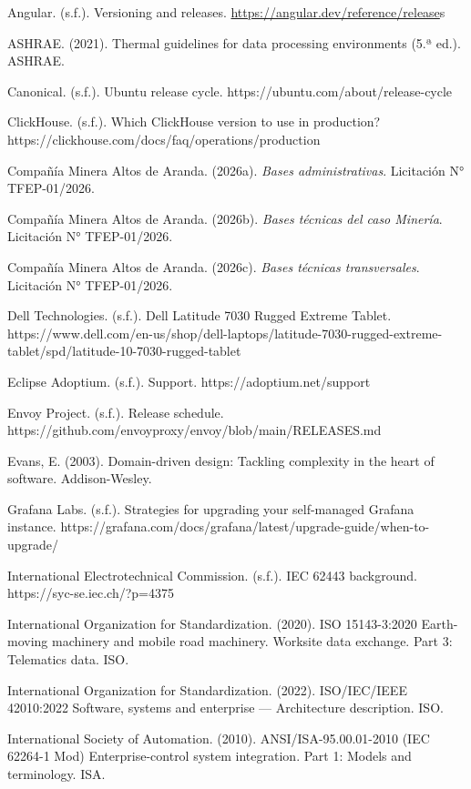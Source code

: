 \documentclass[subdoc]{../../comun/overfore}
\begin{document}
\begin{referencias}
\item Angular. (s.f.). Versioning and releases. \href{https://angular.dev/reference/releases}{https://angular.dev/reference/release}s
\item ASHRAE. (2021). Thermal guidelines for data processing environments (5.ª ed.). ASHRAE.
\item Canonical. (s.f.). Ubuntu release cycle. https://ubuntu.com/about/release-cycle
\item ClickHouse. (s.f.). Which ClickHouse version to use in production? https://clickhouse.com/docs/faq/operations/production
\item Compañía Minera Altos de Aranda. (2026a). \emph{Bases administrativas}. Licitación N° TFEP-01/2026.
\item Compañía Minera Altos de Aranda. (2026b). \emph{Bases técnicas del caso Minería}. Licitación N° TFEP-01/2026.
\item Compañía Minera Altos de Aranda. (2026c). \emph{Bases técnicas transversales}. Licitación N° TFEP-01/2026.
\item Dell Technologies. (s.f.). Dell Latitude 7030 Rugged Extreme Tablet. https://www.dell.com/en-us/shop/dell-laptops/latitude-7030-rugged-extreme-tablet/spd/latitude-10-7030-rugged-tablet
\item Eclipse Adoptium. (s.f.). Support. https://adoptium.net/support
\item Envoy Project. (s.f.). Release schedule. https://github.com/envoyproxy/envoy/blob/main/RELEASES.md
\item Evans, E. (2003). Domain-driven design: Tackling complexity in the heart of software. Addison-Wesley.
\item Grafana Labs. (s.f.). Strategies for upgrading your self-managed Grafana instance. https://grafana.com/docs/grafana/latest/upgrade-guide/when-to-upgrade/
\item International Electrotechnical Commission. (s.f.). IEC 62443 background. https://syc-se.iec.ch/?p=4375
\item International Organization for Standardization. (2020). ISO 15143-3:2020 Earth-moving machinery and mobile road machinery. Worksite data exchange. Part 3: Telematics data. ISO.
\item International Organization for Standardization. (2022). ISO/IEC/IEEE 42010:2022 Software, systems and enterprise — Architecture description. ISO.
\item International Society of Automation. (2010). ANSI/ISA-95.00.01-2010 (IEC 62264-1 Mod) Enterprise-control system integration. Part 1: Models and terminology. ISA.

\end{referencias}
\end{document}

